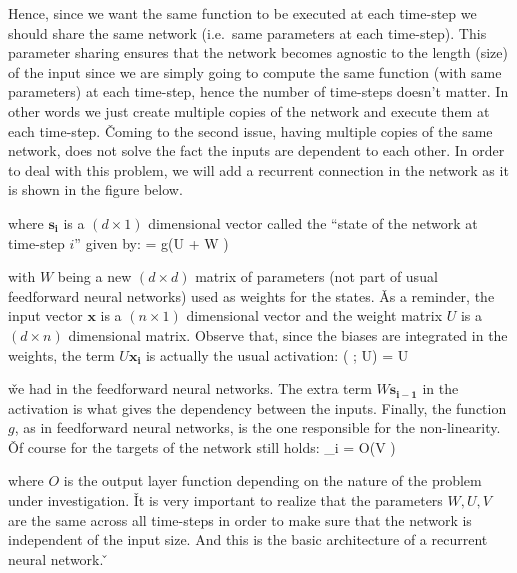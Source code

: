 Hence, since we want the same function to be executed at each time-step we should share the same network (i.e.\ same
parameters at each time-step). This parameter sharing ensures that the network becomes agnostic to the length (size)
of the input since we are simply going to compute the same function (with same parameters) at each time-step, hence
the number of time-steps doesn't matter. In other words we just create multiple copies of the network and execute
them at each time-step. \v

Coming to the second issue, having multiple copies of the same network, does not solve the fact the inputs are
dependent to each other. In order to deal with this problem, we will add a recurrent connection in the network as it
is shown in the figure below.


where $\boldsymbol{s_i} $ is a $(d \times 1)$ dimensional vector called the ``state of the network at time-step $i$''
given by:
\bse
{} = g(U  + W )
\ese

with $W$ being a new $(d \times d)$ matrix of parameters (not part of usual feedforward neural networks) used as
weights for the states. \v

As a reminder, the input vector $\boldsymbol{x}$ is a $(n \times 1)$ dimensional vector and the weight matrix $U$ is
a $(d\times n)$ dimensional matrix. Observe that, since the biases are integrated in the weights, the term $U
\boldsymbol{x_i}$ is actually the usual activation:
\bse
{}( ; U) = U 
\ese

\v

we had in the feedforward neural networks. The extra term $W \boldsymbol{s_{i-1}}$ in the activation is what gives
the dependency between the inputs. Finally, the function $g$, as in feedforward neural networks, is the one
responsible for the non-linearity. \v

Of course for the targets of the network still holds:
\bse
{}_i = O(V )
\ese

where $O$ is the output layer function depending on the nature of the problem under investigation. \v

It is very important to realize that the parameters $W, U, V$ are the same across all time-steps in order to make
sure that the network is independent of the input size. And this is the basic architecture of a recurrent neural
network. \v

